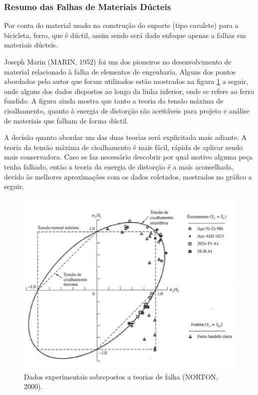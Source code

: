 \subsubsection{Resumo das Falhas de Materiais Dúcteis}

Por conta do material usado na construção do suporte (tipo cavalete) para a bicicleta, ferro, que é dúctil, assim sendo será dado enfoque apenas a falhas em materiais dúcteis.

Joseph Marin (MARIN, 1952) foi um dos pioneiros no desenvolvimento de material relacionado à falha de elementos de engenharia. Alguns dos pontos abordados pelo autor que foram utilizados estão mostrados na figura \ref{teoria-falha} a seguir, onde alguns dos dados dispostos ao longo da linha inferior, onde se refere ao ferro fundido. A figura ainda mostra que tanto a teoria da tensão máxima de cisalhamento, quanto à energia de distorção são aceitáveis para projeto e análise de materiais que falham de forma dúctil.

A decisão quanto abordar um das duas teorias será explicitada mais adiante. A teoria da tensão máxima de cisalhamento é mais fácil, rápida de aplicar sendo mais conservadora. Caso se faz necessário descobrir por qual motivo alguma peça tenha falhado, então a teoria da energia de distorção é a mais aconselhada, devido às melhores aproximações com os dados coletados, mostrados no gráfico a seguir.

\begin{figure}[h]
\centering
\includegraphics[scale=0.7]{figuras/falhas_norton.png}
\caption{Dados experimentais sobrepostos a teorias de falha (NORTON, 2000).}
\label{teoria-falha}
\end{figure}

